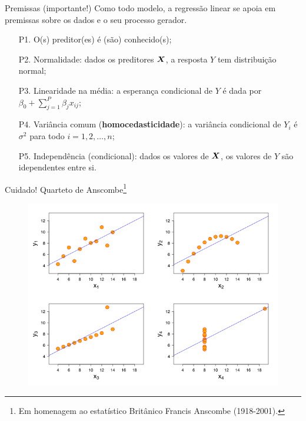 \begin{frame}{Premissas (importante!)}
Como todo modelo, a regressão linear se apoia em premissas sobre os dados e o seu processo gerador.
\begin{itemize}
 \item[P1.] O(s) preditor(es) é (são) conhecido(s);
 \item[P2.] Normalidade: dados os preditores $\boldsymbol{X}$, a resposta $Y$ tem distribuição normal;
 \item[P3.] Linearidade na média: a esperança condicional de $Y$ é dada por $\beta_0 + \sum_{j=1}^P \beta_jx_{ij}$;
 \item[P4.] Variância comum (\textbf{homocedasticidade}): a variância condicional de $Y_i$ é  $\sigma^2$ para todo $i = 1, 2, \ldots, n$;
 \item[P5.] Independência (condicional): dados os valores de $\boldsymbol{X}$, os valores de $Y$ são idependentes entre si.
\end{itemize}
\end{frame}

\begin{frame}{Cuidado! Quarteto de Anscombe\footnote{Em homenagem ao estatístico Britânico Francis Anscombe (1918-2001).}}
  \begin{figure}
  \begin{center}
   \includegraphics[scale=.435]{figures/anscombe.png}
  \end{center}
 \end{figure}
\end{frame}

